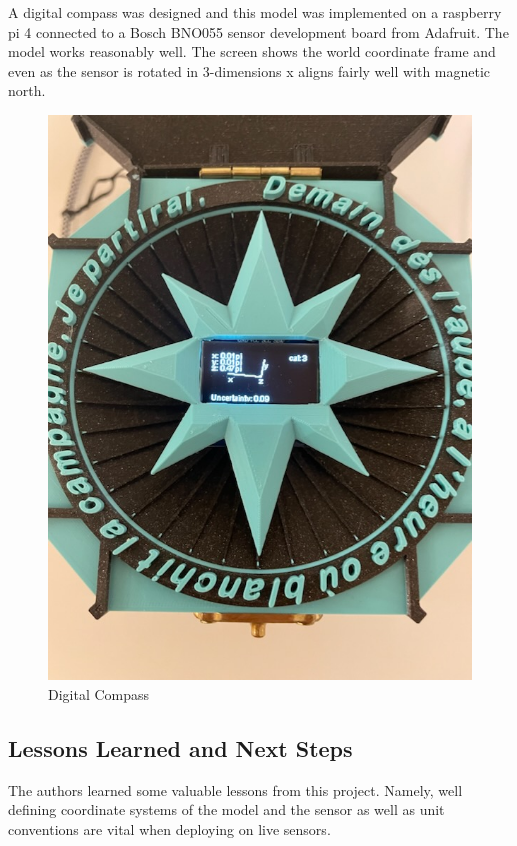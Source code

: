 \documentclass[conference]{IEEEtran}
\begin{document}
A digital compass was designed and this model was implemented on a raspberry pi 4 connected to a Bosch BNO055 sensor development board from Adafruit. The model works reasonably well. The screen shows the world coordinate frame and even as the sensor is rotated in 3-dimensions x aligns fairly well with magnetic north.  
\begin{figure}[h!]
  \includegraphics[width=\columnwidth]{IMG_20231012_140921.jpg}
  \caption{Digital Compass}
  \label{fig:compass_picture}
\end{figure}

\subsection{Lessons Learned and Next Steps}

The authors learned some valuable lessons from this project. Namely, well defining coordinate systems of the model and the sensor as well as unit conventions are vital when deploying on live sensors.
\end{document}
